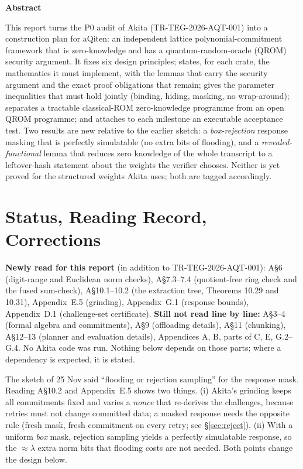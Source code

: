 \documentclass[11pt]{article}
\renewcommand{\_}{\textunderscore\allowbreak{}}
\theoremstyle{definition}
\begin{document}
\newpage
\begin{center}\textbf{Abstract}\end{center}
\noindent
This report turns the P0 audit of Akita (TR-TEG-2026-AQT-001) into a construction plan for aQiten: an independent lattice
polynomial-commitment framework that is zero-knowledge and has a quantum-random-oracle (QROM) security argument.
It fixes six design principles; states, for each crate, the mathematics it must implement, with the lemmas that carry the security argument and the exact proof obligations that remain; gives the parameter inequalities that must hold jointly (binding, hiding, masking, no wrap-around); separates a tractable classical-ROM zero-knowledge programme from an open QROM programme; and attaches to each milestone an executable acceptance test.
Two results are new relative to the earlier sketch: a \emph{box-rejection} response masking that is perfectly simulatable (no extra bits of flooding), and a \emph{revealed-functional} lemma that reduces zero knowledge of the whole transcript to a leftover-hash statement about the weights the verifier chooses. Neither is yet proved for the structured weights Akita uses; both are tagged accordingly.

\tableofcontents
\newpage

\section{Status, Reading Record, Corrections}
\textbf{Newly read for this report} (in addition to TR-TEG-2026-AQT-001): A\S6 (digit-range and Euclidean norm checks), A\S7.3--7.4 (quotient-free ring check and the fused sum-check), A\S10.1--10.2 (the extraction tree, Theorems 10.29 and 10.31), Appendix~E.5 (grinding), Appendix~G.1 (response bounds), Appendix~D.1 (challenge-set certificate).
\textbf{Still not read line by line:} A\S3--4 (formal algebra and commitments), A\S9 (offloading details), A\S11 (chunking), A\S12--13 (planner and evaluation details), Appendices A, B, parts of C, E, G.2--G.4. No Akita code was run. Nothing below depends on those parts; where a dependency is expected, it is stated.

\begin{findingbox}[title={Visible correction to the earlier sketch}]
The sketch of 25 Nov said ``flooding or rejection sampling'' for the response mask. Reading A\S10.2 and Appendix~E.5 shows two things. (i) Akita's grinding keeps all commitments fixed and varies a \emph{nonce} that re-derives the challenges, because retries must not change committed data; a masked response needs the opposite rule (fresh mask, fresh commitment on every retry; see \S\ref{sec:reject}). (ii) With a uniform \emph{box} mask, rejection sampling yields a perfectly simulatable response, so the $\approx\lambda$ extra norm bits that flooding costs are not needed. Both points change the design below.
\end{findingbox}
\end{document}
